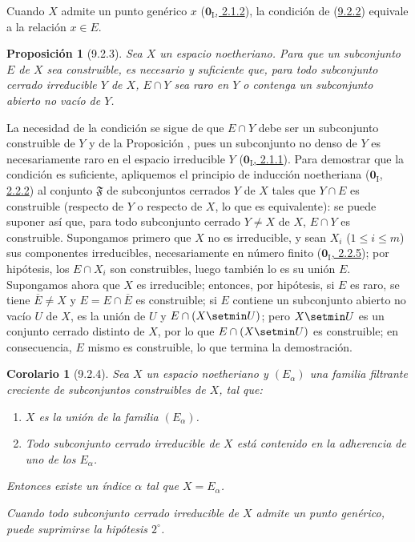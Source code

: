 \documentclass[10pt,oneside,openany]{book}
\theoremstyle{egaenv}\newtheorem*{env}{---}
\theoremstyle{egastatement}
\newtheorem*{proposition}{Proposición}
\newtheorem*{corollary}{Corolario}
\theoremstyle{egadescription}
\renewcommand{\leq}{\leqslant}
\begin{document}
Cuando $X$ admite un punto genérico $x$
(\hyperref[0.2.1.2-fr]{$\mathbf{0}_{\mathrm I}$, 2.1.2}), la condición de (\hyperref[0.9.2.2-fr]{9.2.2}) equivale a la relación $x\in E$.

\begin{proposition}[9.2.3]
\label{0.9.2.3}
\label{0.9.2.3-fr}
Sea $X$ un espacio noetheriano.
Para que un subconjunto $E$ de $X$ sea construible, es necesario y suficiente que, para todo subconjunto cerrado irreducible $Y$ de $X$, $E\cap Y$ sea raro en $Y$ o contenga un subconjunto abierto no vacío de $Y$.
\end{proposition}


La necesidad de la condición se sigue de que $E\cap Y$ debe ser un subconjunto construible de $Y$ y de la Proposición , pues un subconjunto no denso de $Y$ es necesariamente raro en el espacio irreducible $Y$ (\hyperref[0.2.1.1-fr]{$\mathbf{0}_{\mathrm I}$, 2.1.1}). Para demostrar que la condición es suficiente, apliquemos el principio de inducción noetheriana (\hyperref[0.2.2.2-fr]{$\mathbf{0}_{\mathrm I}$, 2.2.2}) al conjunto
$\mathfrak{F}$ de subconjuntos cerrados $Y$ de $X$ tales que $Y\cap E$ es construible (respecto de $Y$ o respecto de $X$, lo que es equivalente): se puede suponer así que, para todo subconjunto cerrado $Y\ne X$ de $X$, $E\cap Y$ es construible.
Supongamos primero que $X$ no es irreducible, y sean $X_i$ ($1\leq i\leq m$) sus componentes irreducibles, necesariamente en número finito (\hyperref[0.2.2.5-fr]{$\mathbf{0}_{\mathrm I}$, 2.2.5}); por hipótesis, los
$E\cap X_i$ son construibles, luego también lo es su unión $E$.
Supongamos ahora que $X$ es irreducible; entonces, por hipótesis, si $E$ es raro, se tiene $\overline{E}\ne X$ y $E=E\cap\overline{E}$ es construible; si $E$ contiene un subconjunto abierto no vacío $U$ de $X$, es la unión de $U$ y $E\cap(X\setmin U)$; pero $X\setmin U$ es un conjunto cerrado distinto de $X$, por lo que $E\cap(X\setmin U)$ es construible; en consecuencia, $E$ mismo es construible, lo que termina la demostración.


\begin{corollary}[9.2.4]
\label{0.9.2.4}
\label{0.9.2.4-fr}
Sea $X$ un espacio noetheriano y $(E_\alpha)$ una familia filtrante creciente de subconjuntos construibles de $X$, tal que:
\begin{enumerate}
  \item[$1^\circ$] $X$ es la unión de la familia $(E_\alpha)$.
  \item[$2^\circ$] Todo subconjunto cerrado irreducible de $X$ está contenido en la adherencia de uno de los $E_\alpha$.
\end{enumerate}

Entonces existe un índice $\alpha$ tal que $X=E_\alpha$.

Cuando todo subconjunto cerrado irreducible de $X$ admite un punto genérico, puede suprimirse la hipótesis $2^\circ$.
\end{corollary}
\end{document}
